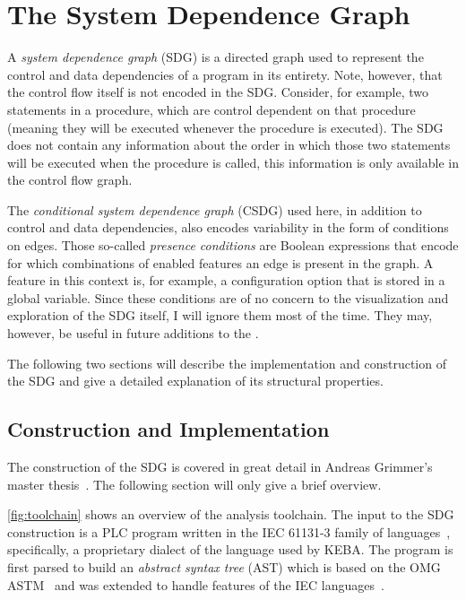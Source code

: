 \chapter{The System Dependence Graph} \label{ch:sdg}

A \emph{system dependence graph} (SDG) is a directed graph used to represent the control and data dependencies of a 
program in its entirety. Note, however, that the control flow itself is not encoded in the SDG. Consider, for example, 
two statements in a procedure, which are control dependent on that procedure (meaning they will be executed whenever 
the procedure is executed). The SDG does not contain any information about the order in which those two statements will 
be executed when the procedure is called, this information is only available in the control flow graph.

The \emph{conditional system dependence graph} (CSDG) used here, in addition to control and data dependencies, also 
encodes variability in the form of conditions on edges. Those so-called \emph{presence conditions} are Boolean 
expressions that encode for which combinations of enabled features an edge is present in the graph. A feature in this 
context is, for example, a configuration option that is stored in a global variable. Since these conditions are of no 
concern to the visualization and exploration of the SDG itself, I will ignore them most of the time. They may, however, 
be useful in future additions to the \SB.

The following two sections will describe the implementation and construction of the SDG and give a detailed 
explanation of its structural properties.


\section{Construction and Implementation}

The construction of the SDG is covered in great detail in Andreas Grimmer's master thesis~\cite{GrimmerDA}. The 
following section will only give a brief overview.

\autoref{fig:toolchain} shows an overview of the analysis toolchain. The input to the SDG construction is a PLC program 
written in the IEC 61131-3 family of languages~\cite{IEC61131:2003}, specifically, a proprietary dialect of the 
language used by KEBA. The program is first parsed to build an \emph{abstract syntax tree} (AST) which is based on the 
OMG ASTM~\cite{ASTM} and was extended to handle features of the IEC languages~\cite[ch.~4]{GrimmerDA}.

